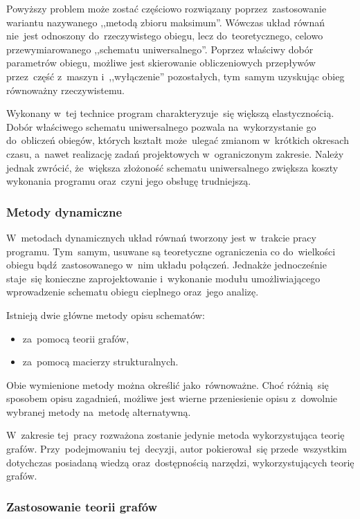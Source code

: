 Powyższy problem może zostać częściowo rozwiązany poprzez~zastosowanie
wariantu nazywanego ,,metodą zbioru maksimum''. Wówczas układ równań
nie~jest odnoszony do~rzeczywistego obiegu, lecz do~teoretycznego,
celowo przewymiarowanego ,,schematu uniwersalnego''. Poprzez właściwy
dobór parametrów obiegu, możliwe jest skierowanie obliczeniowych
przepływów przez~część z~maszyn i~,,wyłączenie'' pozostałych, tym~samym
uzyskując obieg równoważny rzeczywistemu.

Wykonany w~tej technice program charakteryzuje~się większą
elastycznością. Dobór właściwego schematu uniwersalnego pozwala
na~wykorzystanie go do~obliczeń obiegów, których kształt może~ulegać
zmianom w~krótkich okresach czasu, a~nawet realizację zadań projektowych
w~ograniczonym zakresie. Należy jednak zwrócić, że~większa złożoność
schematu uniwersalnego zwiększa koszty wykonania programu oraz~czyni
jego obsługę trudniejszą.


\subsubsection{Metody dynamiczne}

W~metodach dynamicznych układ równań tworzony jest w~trakcie pracy
programu. Tym~samym, usuwane są teoretyczne ograniczenia co do~wielkości
obiegu bądź~zastosowanego w~nim układu połączeń. Jednakże jednocześnie
staje~się konieczne zaprojektowanie i~wykonanie modułu umożliwiającego
wprowadzenie schematu obiegu cieplnego oraz~jego analizę.

Istnieją dwie główne metody opisu schematów:

\begin{itemize}
	\item za~pomocą teorii grafów,

	\item za~pomocą macierzy strukturalnych.
\end{itemize}

Obie wymienione metody można określić jako~równoważne. Choć różnią~się
sposobem opisu zagadnień, możliwe jest wierne przeniesienie opisu
z~dowolnie wybranej metody na~metodę alternatywną.

W~zakresie tej~pracy rozważona zostanie jedynie metoda wykorzystująca
teorię grafów. Przy~podejmowaniu tej~decyzji, autor pokierował~się
przede~wszystkim dotychczas posiadaną wiedzą oraz~dostępnością narzędzi,
wykorzystujących teorię grafów.


\subsubsection{Zastosowanie teorii grafów}

